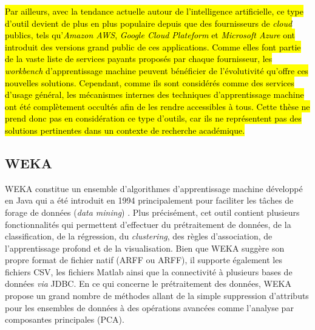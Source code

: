 \hl{Par ailleurs, avec la tendance actuelle autour de l'intelligence artificielle, ce type d'outil devient de plus en plus populaire depuis que des fournisseurs de \textit{cloud} publics, tels qu'\textit{Amazon AWS}, \textit{Google Cloud Plateform} et \textit{Microsoft Azure} ont introduit des versions grand public de ces applications. Comme elles font partie de la vaste liste de services payants proposés par chaque fournisseur, les \textit{workbench} d'apprentissage machine peuvent bénéficier de l'évolutivité qu'offre ces nouvelles solutions. Cependant, comme ils sont considérés comme des services d'usage général, les mécanismes internes des techniques d'apprentissage machine ont été complètement occultés afin de les rendre accessibles à tous. Cette thèse ne prend donc pas en considération ce type d'outils, car ils ne représentent pas des solutions pertinentes dans un contexte de recherche académique.}

\subsection{WEKA}

\acs{WEKA} constitue un ensemble d'algorithmes d'apprentissage machine développé en Java qui a été introduit en 1994 principalement pour faciliter les tâches de forage de données (\textit{data mining}) \citep{Holmes1994}. Plus précisément, cet outil contient plusieurs fonctionnalités qui permettent d'effectuer du prétraitement de données, de la classification, de la régression, du \textit{clustering}, des règles d'association, de l'apprentissage profond et de la visualisation. Bien que \acs{WEKA} suggère son propre format de fichier natif (\acl{ARFF} ou \acs{ARFF}), il supporte également les fichiers \acs{CSV}, les fichiers Matlab ainsi que la connectivité à plusieurs bases de données \textit{via} \ac{JDBC}. En ce qui concerne le prétraitement des données, \acs{WEKA} propose un grand nombre de méthodes allant de la simple suppression d'attributs pour les ensembles de données à des opérations avancées comme l'analyse par composantes principales (\acs{PCA}).

